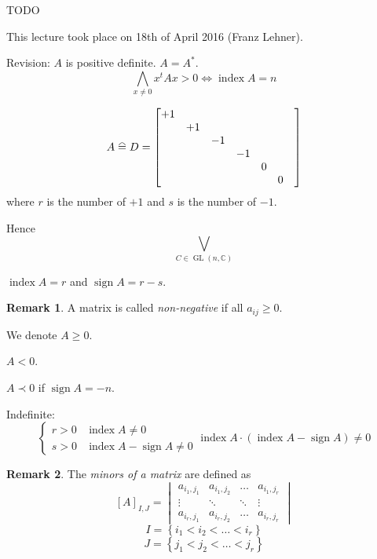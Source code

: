 \documentclass[a4paper,landscape,twocolumn]{article}
\newcommand\meta[3]{This #1 took place on #2 (#3).\par}
\newcommand\set[1]{\left\{#1\right\}}
\newcommand\equalhat{\mathrel{\stackon[1.5pt]{=}{\stretchto{%
    \scalerel*[\widthof{=}]{\wedge}{\rule{1ex}{3ex}}}{0.5ex}}}}
\theoremstyle{definition}
\newtheorem{rem}{Remark}
\DeclareMathOperator\sign{sign}
\DeclareMathOperator\ind{index}
\begin{document}
TODO

\meta{lecture}{18th of April 2016}{Franz Lehner}

Revision:
$A$ is positive definite. $A = A^*$.
\[ \bigwedge_{x \neq 0} x^t A x > 0 \Leftrightarrow \ind{A} = n \]

\[
  A \equalhat D =
  \begin{bmatrix}
    +1 &    &    &    &   &   &  \\
       & +1 &    &    &   &   &  \\
       &    & -1 &    &   &   &  \\
       &    &    & -1 &   &   &  \\
       &    &    &    & 0 &   &  \\
       &    &    &    &   & 0 &  \\
  \end{bmatrix}
\]
where $r$ is the number of $+1$ and $s$ is the number of $-1$.

Hence
\[ \bigvee_{C \in \operatorname{GL}(n,\mathbb C)} \]

$\ind{A} = r$ and $\sign{A} = r - s$.

\begin{rem}
  A matrix is called \emph{non-negative}
  if all $a_{ij} \geq 0$.

  We denote $A \geq 0$.

  $A < 0$.

  $A \prec 0$ if $\sign{A} = -n$.

  Indefinite:
  \[
    \begin{cases}
      r > 0   & \ind{A} \neq 0 \\
      s > 0   & \ind{A} - \sign{A} \neq 0
    \end{cases}
    \ind{A} \cdot (\ind{A} - \sign{A}) \neq 0
  \]
\end{rem}

\begin{rem}
  The \emph{minors of a matrix} are defined as
  \[
    [A]_{I,J} = \begin{vmatrix}
      a_{i_1,j_1} & a_{i_1,j_2} & \ldots & a_{i_1,j_r} \\
      \vdots      & \ddots      & \ddots & \vdots \\
      a_{i_r,j_1} & a_{i_r,j_2} & \ldots & a_{i_r,j_r}
    \end{vmatrix}
  \]
  \[ I = \set{i_1 < i_2 < \ldots < i_r} \]
  \[ J = \set{j_1 < j_2 < \ldots < j_r} \]
\end{rem}
\end{document}
